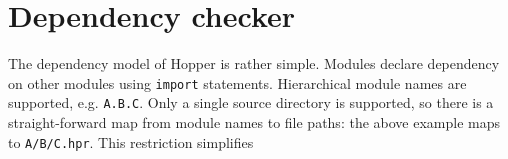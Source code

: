 \section{Dependency checker}

The dependency model of Hopper is rather simple. Modules declare dependency
on other modules using \texttt{import} statements. Hierarchical module
names are supported, e.g. \texttt{A.B.C}. Only a single
source directory is supported, so there is a straight-forward map from module
names to file paths: the above example maps to \texttt{A/B/C.hpr}. This
restriction simplifies 


